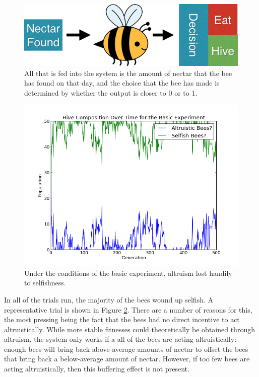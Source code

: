 \documentclass[twoside]{article}
\begin{document}
\begin{multicols}{2}
			\begin{figure}[H]
				\begin{center}
					\includegraphics[width=.4\textwidth]{bee_diagrams/naive_system.png}
				\end{center}
				\caption{All that is fed into the system is the amount of nectar that the bee has found on that day, and the choice that the bee has made is determined by whether the output is closer to 0 or to 1.}
				\label{fig:naive_system}
			\end{figure}

			\begin{figure}[H]
				\begin{center}
					\includegraphics[width=.5\textwidth]{results/basic_comp.png}
				\end{center}
				\caption{Under the conditions of the basic experiment, altruism lost handily to selfishness.}
				\label{fig:basic_experiment_composition}
			\end{figure}

			In all of the trials run, the majority of the bees wound up selfish. A representative trial is shown in Figure \ref{fig:basic_experiment_composition}. There are a number of reasons for this, the most pressing being the fact that the bees had no direct incentive to act altruistically. While more stable fitnesses could theoretically be obtained through altruism, the system only works if a all of the bees are acting altruistically: enough bees will bring back above-average amounts of nectar to offset the bees that bring back a below-average amount of nectar. However, if too few bees are acting altruistically, then this buffering effect is not present. 



\end{multicols}
\end{document}
